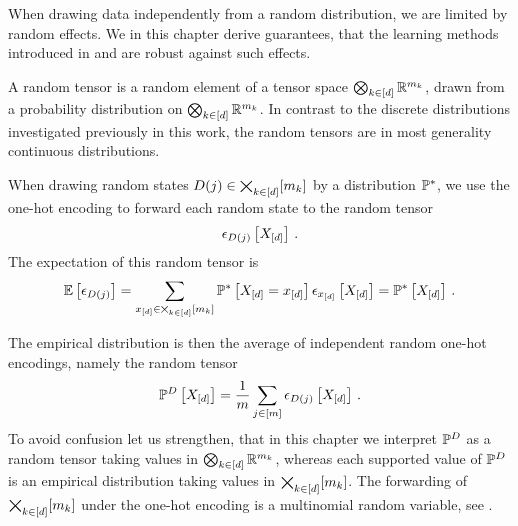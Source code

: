 \chapter{\chatextconcentration}\label{cha:concentration}

When drawing data independently from a random distribution, we are limited by random effects.
We in this chapter derive guarantees, that the learning methods introduced in  and  are robust against such effects.


A random tensor is a random element of a tensor space $\bigotimes_{k\in[d]} \mathbb{R}^{m_{k}}$, drawn from a probability distribution on $\bigotimes_{k\in[d]} \mathbb{R}^{m_{k}}$.
In contrast to the discrete distributions investigated previously in this work, the random tensors are in most generality continuous distributions. %


When drawing random states $D(j)\in\bigtimes_{k\in[d]}[m_{k}]$ by a distribution $\mathbb{P}^*$, we use the one-hot encoding to forward each random state to the random tensor
\begin{align*}
    \epsilon_{D(j)}\left[X_{[d]}\right] \, .
\end{align*}
The expectation of this random tensor is
\begin{align*}
    \mathbb{E}\left[\epsilon_{D(j)}\right]
    = \sum_{x_{[d]}\in\bigtimes_{k\in[d]}[m_{k}]} \mathbb{P}^*\left[X_{[d]}=x_{[d]}\right] \epsilon_{x_{[d]}}\left[X_{[d]}\right]
    = \mathbb{P}^*\left[X_{[d]}\right] \, .
\end{align*}

The empirical distribution is then the average of independent random one-hot encodings, namely the random tensor
\begin{align*}
    \mathbb{P}^{D}\left[X_{[d]}\right] = \frac{1}{m} \sum_{j\in[m]}  \epsilon_{D(j)}\left[X_{[d]}\right] \, .
\end{align*}
To avoid confusion let us strengthen, that in this chapter we interpret $\mathbb{P}^{D}$ as a random tensor taking values in $\bigotimes_{k\in[d]} \mathbb{R}^{m_{k}}$, whereas each supported value of $\mathbb{P}^{D}$ is an empirical distribution taking values in $\bigtimes_{k\in[d]}[m_{k}]$.
The forwarding of $\bigtimes_{k\in[d]}[m_{k}]$ under the one-hot encoding is a multinomial random variable, see .


